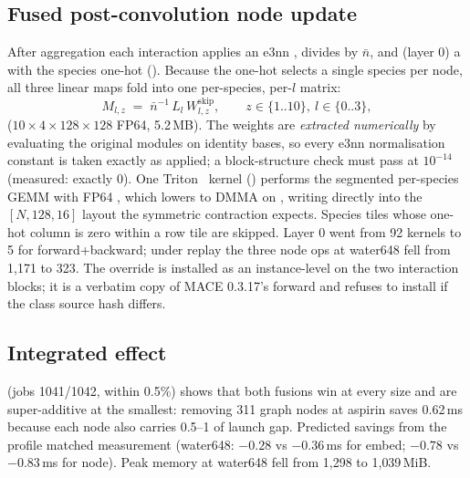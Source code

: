 \subsection{Fused post-convolution node update}
After aggregation each interaction applies an e3nn , divides by $\bar n$, and (layer 0) a  with the species one-hot (). Because the one-hot selects a single species per node, all three linear maps fold into one per-species, per-$l$ matrix:
\begin{equation}
  M_{l,z} \;=\; \bar n^{-1}\, L_l\, W^{\text{skip}}_{l,z}, \qquad z\in\{1..10\},\ l\in\{0..3\},
\end{equation}
($10\times4\times128\times128$ FP64, 5.2\,MB). The weights are \emph{extracted numerically} by evaluating the original modules on identity bases, so every e3nn normalisation constant is taken exactly as applied; a block-structure check must pass at $10^{-14}$ (measured: exactly 0). One Triton~\cite{tillet2019triton} kernel () performs the segmented per-species GEMM with FP64 , which lowers to DMMA  on , writing directly into the $[N,128,16]$ layout the symmetric contraction expects. Species tiles whose one-hot column is zero within a row tile are skipped. Layer 0 went from 92 kernels to 5 for forward+backward; under replay the three node ops at water648 fell from 1{,}171 to 323\us. The override is installed as an instance-level  on the two interaction blocks; it is a verbatim copy of MACE 0.3.17's forward and refuses to install if the class source hash differs.

\subsection{Integrated effect}
 (jobs 1041/1042, within 0.5\%) shows that both fusions win at every size and are super-additive at the smallest: removing 311 graph nodes at aspirin saves 0.62\,ms because each node also carries 0.5--1\us{} of launch gap. Predicted savings from the profile matched measurement (water648: $-0.28$ vs $-0.36$\,ms for embed; $-0.78$ vs $-0.83$\,ms for node). Peak memory at water648 fell from 1{,}298 to 1{,}039\,MiB.

